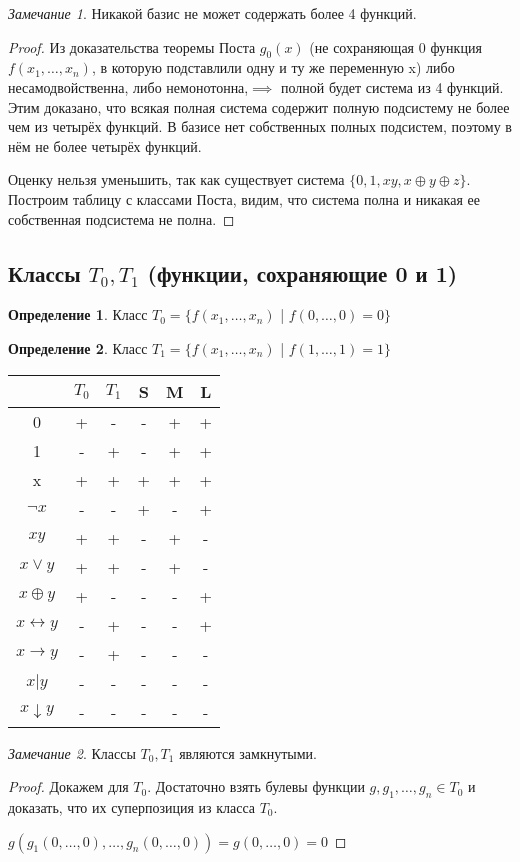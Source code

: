 \documentclass[a4paper]{article}
\theoremstyle{definition}
\newtheorem*{definition}{Определение}
\theoremstyle{remark}
\newtheorem*{remark}{Замечание}
\begin{document}
    \begin{remark}
        Никакой базис не может содержать более 4 функций.
    \end{remark}
    \begin{proof}
        Из доказательства теоремы Поста $g_0(x)$ (не сохраняющая 0 функция $f(x_1, \dots, x_n)$, 
        в которую подставлили одну и ту же переменную x) либо несамодвойственна, либо немонотонна,$\implies$
        полной будет система из 4 функций.
        Этим доказано, что всякая полная система содержит полную подсистему не более чем из четырёх функций. 
        В базисе нет собственных полных подсистем, поэтому в нём не более четырёх функций.
        
        Оценку нельзя уменьшить, так как существует система $\{0, 1, xy, x\oplus y \oplus z\}$.
        Построим таблицу с классами Поста, видим, что система полна и никакая ее собственная
        подсистема не полна.
    \end{proof}
    \subsection{Классы $T_0, T_1$ (функции, сохраняющие 0 и 1)}
    \begin{definition}
        Класс $T_0 = \{f(x_1,\dots, x_n)$ | $f(0, \dots, 0) = 0\}$
    \end{definition}
    \begin{definition}
        Класс $T_1 = \{f(x_1,\dots, x_n)$ | $f(1, \dots, 1) = 1\}$
    \end{definition}
    \begin{tabular}{c|c|c|c|c|c}
        & $T_0$ & $T_1$ & S & M & L\\
        \hline
        0 & + & - & - & + & +\\
        1 & - & + & - & + & + \\
        x & + & + & + & + & +\\
        $\neg x$ & - & - & +  & - & +\\
        $xy$ & + & + & - & + & -\\
        $x \vee y$ & + & + & - & + & -\\
        $x\oplus y$ & + & - & - & - & +\\
        $x\leftrightarrow y$ & - & + & - & - & +\\
        $x\rightarrow y$ & - & + & - & - & -\\
        $x|y$ & - & - & - & - & -\\
        $x\downarrow y$ & - & - & - & - & -\\
    \end{tabular}
    \begin{remark}
        Классы $T_0, T_1$ являются замкнутыми.
    \end{remark}
    \begin{proof}
        Докажем для $T_0$. Достаточно взять булевы функции $g, g_1, \dots, g_n\in T_0$
        и доказать, что их суперпозиция из класса $T_0.$

        $g(g_1 (0, \dots, 0), \dots, g_n(0, \dots, 0)) = g(0, \dots, 0) = 0$
    \end{proof}
\end{document}
